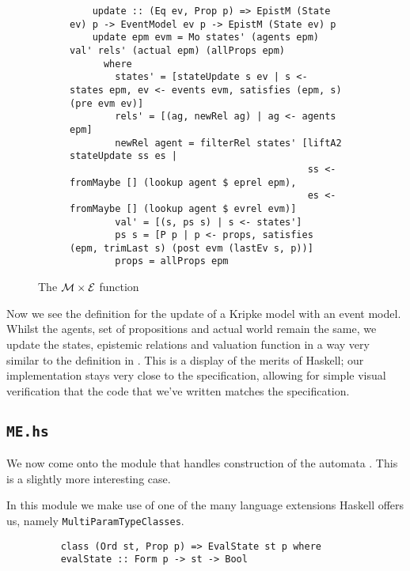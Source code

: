 \documentclass[12pt, a4paper]{article}
\begin{document}
\begin{figure}[h]
  \begin{subfigure}[b]{0.5\textwidth}
  \begin{verbatim}
    update :: (Eq ev, Prop p) => EpistM (State ev) p -> EventModel ev p -> EpistM (State ev) p
    update epm evm = Mo states' (agents epm) val' rels' (actual epm) (allProps epm)
      where
        states' = [stateUpdate s ev | s <- states epm, ev <- events evm, satisfies (epm, s) (pre evm ev)]
        rels' = [(ag, newRel ag) | ag <- agents epm]
        newRel agent = filterRel states' [liftA2 stateUpdate ss es |
                                          ss <- fromMaybe [] (lookup agent $ eprel epm),
                                          es <- fromMaybe [] (lookup agent $ evrel evm)]
        val' = [(s, ps s) | s <- states']
        ps s = [P p | p <- props, satisfies (epm, trimLast s) (post evm (lastEv s, p))]
        props = allProps epm
  \end{verbatim}
\end{subfigure}
\caption{The $\mathcal{M} \times \mathcal{E}$ function}
\label{fig:update}
\end{figure}

Now we see the definition for the update of a Kripke model with an event model.
Whilst the agents, set of propositions and actual world remain the same, we
update the states, epistemic relations and valuation function in a way very
similar to the definition in . This is a display of
the merits of Haskell; our implementation stays very close to the specification,
allowing for simple visual verification that the code that we've written matches
the specification. 

\subsection{\texttt{ME.hs}}
\label{sec:MEHaskell}

We now come onto the module that handles construction of the automata \mestar.
This is a slightly more interesting case.

In this module we make use of one of the many language extensions Haskell offers
us, namely \texttt{MultiParamTypeClasses}.

\begin{figure}
  \begin{verbatim}
    class (Ord st, Prop p) => EvalState st p where
    evalState :: Form p -> st -> Bool
  \end{verbatim}
\end{figure}
\end{document}
